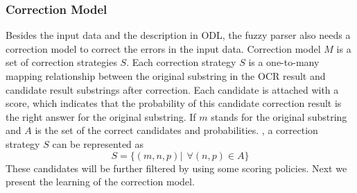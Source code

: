 \subsubsection{Correction Model}
\label{sec:corrmodel}
Besides the input data and the description in ODL, the fuzzy parser 
also needs a correction model to correct the errors in the input data. 
Correction model $M$ is a set of correction 
strategies $S$. 
Each correction strategy $S$ is a one-to-many mapping relationship between 
the original substring in the OCR result and candidate result substrings 
after correction. Each candidate is attached with a score, 
which indicates that the probability of this candidate correction result is 
the right answer for the original substring. 
If $m$ stands for the original substring and $A$ is the 
set of the correct candidates and probabilities. 
, a correction strategy $S$ can be represented as 
\begin{equation}
S=\{(m, n, p)|~~\forall (n, p) \in A\}
\end{equation}
These candidates will be further filtered by using some scoring policies. 
Next we present the learning of the correction model. 

